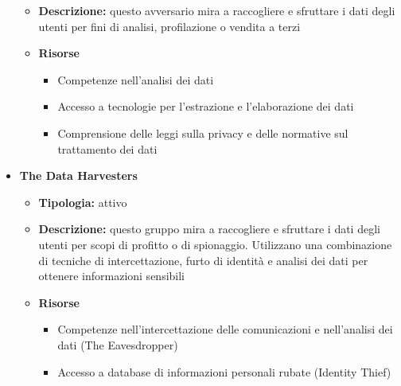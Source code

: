 \begin{itemize}
\begin{itemize}
                \item \textbf{Descrizione:} questo avversario mira a raccogliere e sfruttare i dati degli utenti per fini di analisi, profilazione o vendita a terzi

                \item \textbf{Risorse}
                    \begin{itemize}
                        \item Competenze nell'analisi dei dati
                        
                        \vspace{3mm}

                        \item Accesso a tecnologie per l'estrazione e l'elaborazione dei dati

                        \vspace{3mm}

                        \item Comprensione delle leggi sulla privacy e delle normative sul trattamento dei dati
                    \end{itemize}
            \end{itemize}


        \item \textbf{The Data Harvesters}
            \begin{itemize}
                \item \textbf{Tipologia:} attivo

                \item \textbf{Descrizione:} questo gruppo mira a raccogliere e sfruttare i dati degli utenti per scopi di profitto o di spionaggio. Utilizzano una combinazione di tecniche di intercettazione, furto di identità e analisi dei dati per ottenere informazioni sensibili

                \item \textbf{Risorse}
                    \begin{itemize}
                        \item Competenze nell'intercettazione delle comunicazioni e nell'analisi dei dati (The Eavesdropper)
                        
                        \vspace{3mm}

                        \item Accesso a database di informazioni personali rubate (Identity Thief)


\end{itemize}
\end{itemize}
\end{itemize}
